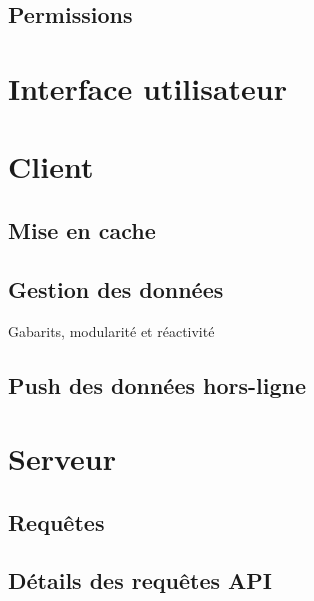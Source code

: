 \documentclass{EPL-master-thesis-covers-FR}
\begin{document}
			

			\subsection*{Permissions}

			

		\section{Interface utilisateur}

		\section{Client}


			\subsection*{Mise en cache}
				\label{sec:cache_client}

			
			\subsection*{Gestion des données}
				Gabarits, modularité et réactivité

			\subsection*{Push des données hors-ligne}
				\label{sec:service_worker}
				
				

			

		\section{Serveur}
			\label{sec:serveur}

		

			\subsection*{Requêtes}

			

			\subsection*{Détails des requêtes API}
				\label{sec:api}
\end{document}
